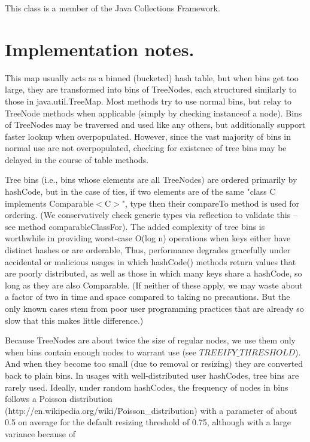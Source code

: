 \documentclass[UTF8,11pt]{ctexbook}
\begin{document}
	This class is a member of the Java Collections Framework.  

	\section{Implementation notes.} 
	This map usually acts as a binned (bucketed) hash table, but
	when bins get too large, they are transformed into bins of
	TreeNodes, each structured similarly to those in
	java.util.TreeMap. Most methods try to use normal bins, but
	relay to TreeNode methods when applicable (simply by checking
	instanceof a node).  Bins of TreeNodes may be traversed and
	used like any others, but additionally support faster lookup
	when overpopulated. However, since the vast majority of bins in
	normal use are not overpopulated, checking for existence of
	tree bins may be delayed in the course of table methods.
	\par
	Tree bins (i.e., bins whose elements are all TreeNodes) are
	ordered primarily by hashCode, but in the case of ties, if two
	elements are of the same "class C implements Comparable$<$C$>$",
	type then their compareTo method is used for ordering. (We
	conservatively check generic types via reflection to validate
	this -- see method comparableClassFor).  The added complexity
	of tree bins is worthwhile in providing worst-case O(log n)
	operations when keys either have distinct hashes or are
	orderable, Thus, performance degrades gracefully under
	accidental or malicious usages in which hashCode() methods
	return values that are poorly distributed, as well as those in
	which many keys share a hashCode, so long as they are also
	Comparable. (If neither of these apply, we may waste about a
	factor of two in time and space compared to taking no
	precautions. But the only known cases stem from poor user
	programming practices that are already so slow that this makes
	little difference.)
	\par	
	Because TreeNodes are about twice the size of regular nodes, we
	use them only when bins contain enough nodes to warrant use
	(see $TREEIFY\_THRESHOLD$). And when they become too small (due to
	removal or resizing) they are converted back to plain bins.  In
	usages with well-distributed user hashCodes, tree bins are
	rarely used.  Ideally, under random hashCodes, the frequency of
	nodes in bins follows a Poisson distribution
	(http://en.wikipedia.org/wiki/Poisson\_distribution) with a
	parameter of about 0.5 on average for the default resizing
	threshold of 0.75, although with a large variance because of
\end{document}
